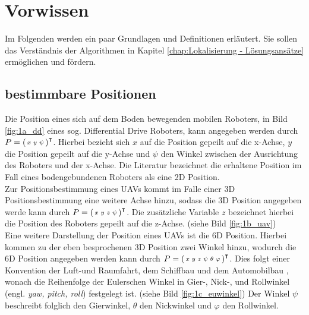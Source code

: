 \clearpage
\chapter{\textbf{Vorwissen}}\label{chap:Vorwissen}
Im Folgenden werden ein paar Grundlagen und Definitionen erläutert. Sie sollen das Verständnis der Algorithmen in Kapitel \ref{chap:Lokalisierung - Lösungsansätze} ermöglichen und fördern. 


\section{bestimmbare Positionen}\label{sec:bestimmbare Positionen}
Die Position eines sich auf dem Boden bewegenden mobilen Roboters, in Bild \ref{fig:1a_dd}  eines sog. Differential Drive Roboters, kann angegeben werden durch 
$P=\mathbf{\begin{psmallmatrix}
x & y & \psi
\end{psmallmatrix}}^\intercal$.
Hierbei bezieht sich $x$ auf die Position gepeilt auf die x-Achse, $y$ die Position gepeilt auf die y-Achse und $\psi$  den Winkel zwischen der Ausrichtung des Roboters und der x-Achse. Die Literatur bezeichnet die erhaltene Position im Fall eines bodengebundenen Roboters als eine 2D Position.\\
Zur Positionsbestimmung eines UAVs kommt im Falle einer 3D Positionsbestimmung eine weitere Achse hinzu, sodass die 3D Position angegeben werde kann durch
$P=\mathbf{\begin{psmallmatrix}
x & y & z & \psi
\end{psmallmatrix}}^\intercal$.
Die zusätzliche Variable $z$ bezeichnet hierbei die Position des Roboters gepeilt auf die z-Achse. (siehe Bild \ref{fig:1b_uav})\\
Eine weitere Darstellung der Position eines UAVs ist die 6D Position. Hierbei kommen zu der eben besprochenen 3D Position zwei Winkel hinzu, wodurch die 6D Position angegeben werden kann durch
$P=\mathbf{\begin{psmallmatrix}
x & y & z & \psi & \theta & \varphi
\end{psmallmatrix}}^\intercal$.
Dies folgt einer Konvention der Luft-und Raumfahrt, dem Schiffbau und dem Automobilbau \cite{website:cosmos-indirekt}, wonach die Reihenfolge der Eulerschen Winkel in Gier-, Nick-, und Rollwinkel (engl. \textit{yaw, pitch, roll}) festgelegt ist. (siehe Bild \ref{fig:1c_euwinkel}) Der Winkel $\psi$ beschreibt folglich den Gierwinkel, $\theta$ den Nickwinkel und $\varphi$ den Rollwinkel. %
